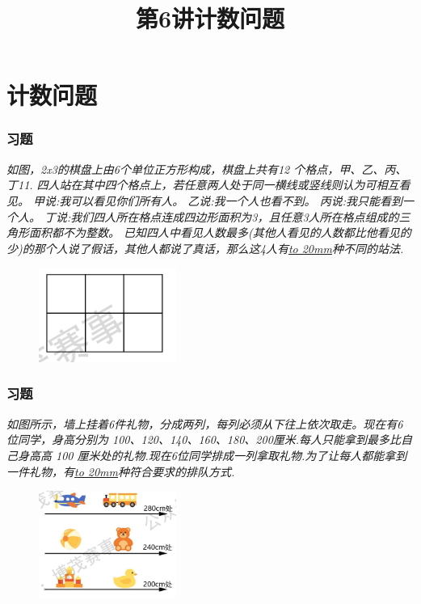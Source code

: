 \section{计数问题}

\title[第6讲\quad 计数问题]{第6讲\quad 计数问题} 
\author{}
\date{}

\begin{frame}
    \titlepage
\end{frame}

\setcounter{framecounter}{0}

\begin{frame}
    \frametitle{习题\theframecounter}
    \textit{如图，2x3的棋盘上由6个单位正方形构成，棋盘上共有12 个格点，甲、乙、丙、丁11.
四人站在其中四个格点上，若任意两人处于同一横线或竖线则认为可相互看见。
甲说:我可以看见你们所有人。
乙说:我一个人也看不到。
丙说:我只能看到一个人。
丁说:我们四人所在格点连成四边形面积为3，且任意3人所在格点组成的三角形面积都不为整数。
已知四人中看见人数最多(其他人看见的人数都比他看见的少)的那个人说了假话，其他人都说了真话，那么这4人有\underline{\hbox to 20mm{}}种不同的站法.}
    \begin{figure}[H] 
        \centering
        \includegraphics[width=0.4\textwidth]{./pics/Chapter_6/1.png}
    \end{figure}
\end{frame}


\begin{frame}
    \frametitle{习题\theframecounter}
    \textit{如图所示，墙上挂着6件礼物，分成两列，每列必须从下往上依次取走。现在有6位同学，身高分别为 100、120、140、160、180、200厘米.每人只能拿到最多比自己身高高 100 厘米处的礼物.现在6位同学排成一列拿取礼物.为了让每人都能拿到一件礼物，有\underline{\hbox to 20mm{}}种符合要求的排队方式.}
    \begin{figure}[H] 
        \centering
        \includegraphics[width=0.4\textwidth]{./pics/Chapter_6/2.png}
    \end{figure}
\end{frame}

